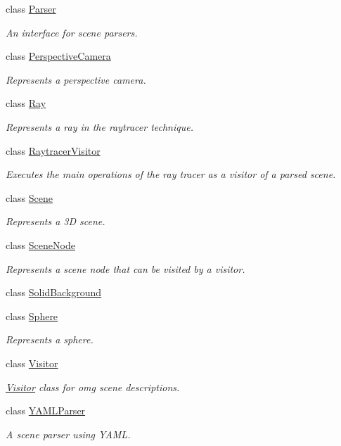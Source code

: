 \begin{DoxyCompactItemize}
class \mbox{\hyperlink{classomg_1_1_parser}{Parser}}
\begin{DoxyCompactList}\small\item\em An interface for scene parsers. \end{DoxyCompactList}\item 
class \mbox{\hyperlink{classomg_1_1_perspective_camera}{Perspective\+Camera}}
\begin{DoxyCompactList}\small\item\em Represents a perspective camera. \end{DoxyCompactList}\item 
class \mbox{\hyperlink{classomg_1_1_ray}{Ray}}
\begin{DoxyCompactList}\small\item\em Represents a ray in the raytracer technique. \end{DoxyCompactList}\item 
class \mbox{\hyperlink{classomg_1_1_raytracer_visitor}{Raytracer\+Visitor}}
\begin{DoxyCompactList}\small\item\em Executes the main operations of the ray tracer as a visitor of a parsed scene. \end{DoxyCompactList}\item 
class \mbox{\hyperlink{classomg_1_1_scene}{Scene}}
\begin{DoxyCompactList}\small\item\em Represents a 3D scene. \end{DoxyCompactList}\item 
class \mbox{\hyperlink{classomg_1_1_scene_node}{Scene\+Node}}
\begin{DoxyCompactList}\small\item\em Represents a scene node that can be visited by a visitor. \end{DoxyCompactList}\item 
class \mbox{\hyperlink{classomg_1_1_solid_background}{Solid\+Background}}
\item 
class \mbox{\hyperlink{classomg_1_1_sphere}{Sphere}}
\begin{DoxyCompactList}\small\item\em Represents a sphere. \end{DoxyCompactList}\item 
class \mbox{\hyperlink{classomg_1_1_visitor}{Visitor}}
\begin{DoxyCompactList}\small\item\em \mbox{\hyperlink{classomg_1_1_visitor}{Visitor}} class for omg scene descriptions. \end{DoxyCompactList}\item 
class \mbox{\hyperlink{classomg_1_1_y_a_m_l_parser}{Y\+A\+M\+L\+Parser}}
\begin{DoxyCompactList}\small\item\em A scene parser using Y\+A\+ML. \end{DoxyCompactList}\end{DoxyCompactItemize}
